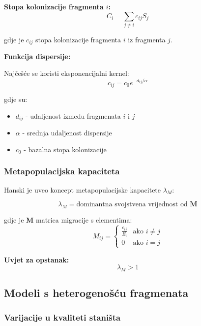 \documentclass[11pt,oneside]{book}
\begin{document}
\textbf{Stopa kolonizacije fragmenta $i$:}
\begin{equation}
	C_i = \sum_{j \neq i} c_{ij} S_j
\end{equation}

gdje je $c_{ij}$ stopa kolonizacije fragmenta $i$ iz fragmenta $j$.

\textbf{Funkcija dispersije:}

Najčešće se koristi eksponencijalni kernel:
\begin{equation}
	c_{ij} = c_0 e^{-d_{ij}/\alpha}
\end{equation}

gdje su:
\begin{itemize}
	\item $d_{ij}$ - udaljenost između fragmenata $i$ i $j$
	\item $\alpha$ - srednja udaljenost dispersije
	\item $c_0$ - bazalna stopa kolonizacije
\end{itemize}

\subsubsection{Metapopulacijska kapaciteta}

Hanski je uveo koncept metapopulacijske kapacitete $\lambda_M$:

\begin{equation}
	\lambda_M = \text{dominantna svojstvena vrijednost od } \mathbf{M}
\end{equation}

gdje je $\mathbf{M}$ matrica migracije s elementima:
\begin{equation}
	M_{ij} = \begin{cases}
		\frac{c_{ij}}{E_i} & \text{ako } i \neq j \\
		0 & \text{ako } i = j
	\end{cases}
\end{equation}

\textbf{Uvjet za opstanak:}
\begin{equation}
	\lambda_M > 1
\end{equation}

\subsection{Modeli s heterogenošću fragmenata}

\subsubsection{Varijacije u kvaliteti staništa}
\end{document}
